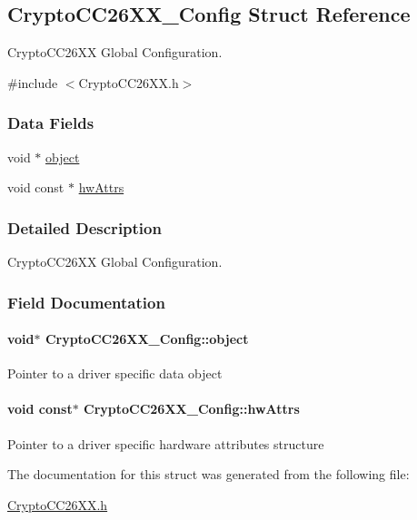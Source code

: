 \subsection{Crypto\-C\-C26\-X\-X\-\_\-\-Config Struct Reference}
\label{struct_crypto_c_c26_x_x___config}


Crypto\-C\-C26\-X\-X Global Configuration.  




{\ttfamily \#include $<$Crypto\-C\-C26\-X\-X.\-h$>$}

\subsubsection*{Data Fields}
\begin{DoxyCompactItemize}
\item 
void $\ast$ \hyperlink{struct_crypto_c_c26_x_x___config_a11efc6993566cb9306ecb09abe42db5e}{object}
\item 
void const $\ast$ \hyperlink{struct_crypto_c_c26_x_x___config_a204edbf9c5427a6c48b6dec37970c4fb}{hw\-Attrs}
\end{DoxyCompactItemize}


\subsubsection{Detailed Description}
Crypto\-C\-C26\-X\-X Global Configuration. 

\subsubsection{Field Documentation}
\paragraph[{object}]{\setlength{\rightskip}{0pt plus 5cm}void$\ast$ Crypto\-C\-C26\-X\-X\-\_\-\-Config\-::object}\label{struct_crypto_c_c26_x_x___config_a11efc6993566cb9306ecb09abe42db5e}
Pointer to a driver specific data object 
\paragraph[{hw\-Attrs}]{\setlength{\rightskip}{0pt plus 5cm}void const$\ast$ Crypto\-C\-C26\-X\-X\-\_\-\-Config\-::hw\-Attrs}\label{struct_crypto_c_c26_x_x___config_a204edbf9c5427a6c48b6dec37970c4fb}
Pointer to a driver specific hardware attributes structure 

The documentation for this struct was generated from the following file\-:\begin{DoxyCompactItemize}
\item 
\hyperlink{_crypto_c_c26_x_x_8h}{Crypto\-C\-C26\-X\-X.\-h}\end{DoxyCompactItemize}
